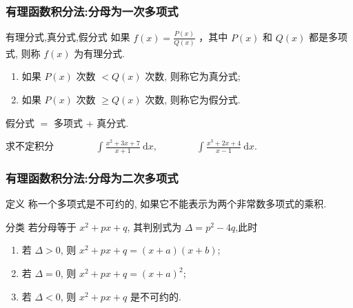 \documentclass[
10pt,
aspectratio=43,
]{beamer}
\begin{document}
\begin{frame}
	\frametitle{有理函数积分法:分母为一次多项式}
	\everymath{\displaystyle}
	\pause
	\begin{block}{有理分式,真分式,假分式}
		如果 $f(x)=\frac{P(x)}{Q(x)}$ ，其中 $P(x)$ 和 $Q(x)$ 都是多项式, 则称 $f(x)$ 为有理分式.
		\begin{enumerate}
			\pause\item  如果 $P(x)$ 次数 $<Q(x)$ 次数, 则称它为真分式;
			      \pause\item  如果 $P(x)$ 次数 $\geqslant Q(x)$ 次数, 则称它为假分式.
		\end{enumerate}
	\end{block}
	\vspace{0.3cm}
	\pause
	\begin{block}{}
		假分式 $=$ 多项式 + 真分式.
	\end{block}
	\pause
	\begin{exampleblock}{求不定积分}
		$\qquad\qquad\int \frac{x^2+3 x+7}{x+1} \mathrm{~d} x,\qquad\qquad\int \frac{x^3+2 x+4}{x-1}\mathrm{~d}x.$
	\end{exampleblock}
\end{frame}

\begin{frame}
	\frametitle{有理函数积分法:分母为二次多项式}
	\everymath{\displaystyle}
	\pause
	\begin{alertblock}{定义}
		称一个多项式是不可约的, 如果它不能表示为两个非常数多项式的乘积.
	\end{alertblock}
	\pause
	\begin{block}{分类}
		若分母等于 $x^2+p x+q$, 其判别式为 $\Delta=p^2-4 q$,此时
		\begin{enumerate}
			\pause\item 若 $\Delta>0$, 则 $x^2+p x+q=(x+a)(x+b)$;
			      \pause\item 若 $\Delta=0$, 则 $x^2+p x+q=(x+a)^2$;
			      \pause\item 若 $\Delta<0$, 则 $x^2+p x+q$ 是不可约的.
		\end{enumerate}
	\end{block}
\end{frame}
\end{document}
